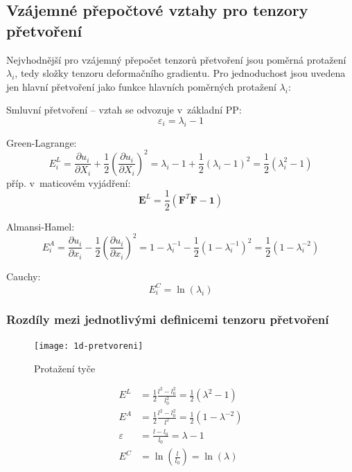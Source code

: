 
\subsection{Vzájemné přepočtové vztahy pro tenzory přetvoření}
Nejvhodnější pro vzájemný přepočet tenzorů přetvoření jsou poměrná protažení $\lambda_i$, tedy složky tenzoru deformačního gradientu. Pro jednoduchost jsou uvedena jen hlavní přetvoření jako funkce hlavních poměrných protažení $\lambda_i$:

Smluvní přetvoření -- vztah se odvozuje v~základní PP: 
\begin{equation}
	\varepsilon_i = \lambda_i - 1
\end{equation}

Green-Lagrange:
\begin{equation}
	E^L_i
	= \frac{\partial u_i}{\partial X_i} + \frac{1}{2} \left(\frac{\partial u_i}{\partial X_i}\right)^2
	= \lambda_i - 1 + \frac{1}{2} (\lambda_i - 1)^2
	= \frac{1}{2} (\lambda_i^2 - 1)
\end{equation}
příp. v~maticovém vyjádření:
\begin{equation}
	\bm{E}^L = \frac{1}{2} \left(\bm{F}^T \bm{F} - \bm{1}\right)
\end{equation}

Almansi-Hamel:
\begin{equation}
	E^A_i
	= \frac{\partial u_i}{\partial x_i} - \frac{1}{2} \left(\frac{\partial u_i}{\partial x_i}\right)^2
	= 1 - \lambda_i^{-1} - \frac{1}{2} (1 - \lambda_i^{-1})^2
	= \frac{1}{2} (1 - \lambda_i^{-2})
\end{equation}

Cauchy:
\begin{equation}
	E^C_i = \ln(\lambda_i)
\end{equation}

\subsubsection{Rozdíly mezi jednotlivými definicemi tenzoru přetvoření}
\begin{figure}[H]
	\centering
	\texttt{[image: 1d-pretvoreni]}
	\caption{Protažení tyče}
	\label{fig:1d-pretvoreni}
\end{figure}

\begin{align}
	E^L &= \frac{1}{2} \frac{l^2 - l_0^2}{l_0^2} = \frac{1}{2} (\lambda^2 - 1)\\
	E^A &= \frac{1}{2} \frac{l^2 - l_0^2}{l^2} = \frac{1}{2} (1 - \lambda^{-2})\\
	\varepsilon &= \frac{l - l_0}{l_0} = \lambda - 1\\
	E^C &= \ln\left(\frac{l}{l_0}\right) = \ln(\lambda)
\end{align}

